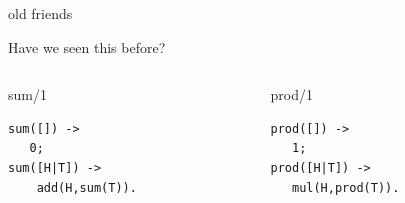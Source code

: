 \begin{frame}[fragile]{old friends}

Have we seen this before?

\pause\vspace{20pt}
\begin{columns}
   \begin{column}{.5\linewidth}
     \begin{block}{sum/1}
       \begin{verbatim}
sum([]) ->
   0;
sum([H|T]) ->
    add(H,sum(T)).
       \end{verbatim}
       \vfill
     \end{block}
   \end{column} 
\pause
   \begin{column}{.5\linewidth}
     \begin{block}{prod/1}
       \begin{verbatim}
prod([]) ->
   1;
prod([H|T]) ->
   mul(H,prod(T)).
       \end{verbatim}
       \vfill
     \end{block}
   \end{column}
  \end{columns}

\vspace{20pt}{\em There is no built-in add/2, nor mul/2, but we can pretend that there is.}

\end{frame}



